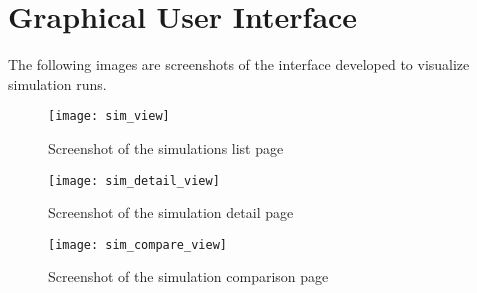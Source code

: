 \chapter{Graphical User Interface} \label{ap1:interface} %

The following images are screenshots of the interface developed to visualize 
simulation runs.

\begin{sidewaysfigure}
    \centering
    \texttt{[image: sim\_view]}
    \caption{Screenshot of the simulations list page}
    \label{fig:sim_view}
\end{sidewaysfigure}

\begin{sidewaysfigure}
    \centering
    \texttt{[image: sim\_detail\_view]}
    \caption{Screenshot of the simulation detail page}
    \label{fig:sim_detail_view}
\end{sidewaysfigure}

\begin{sidewaysfigure}
    \centering
    \texttt{[image: sim\_compare\_view]}
    \caption{Screenshot of the simulation comparison page}
    \label{fig:sim_compare_view}
\end{sidewaysfigure}
